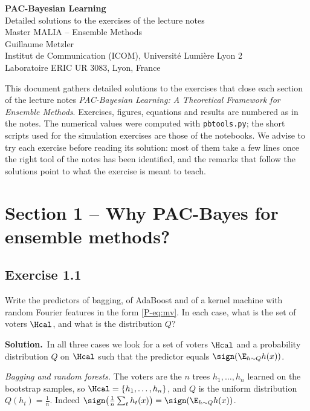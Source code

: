 \documentclass[11pt]{article}
\newcommand{\statement}[1]{\begin{tcolorbox}[enhanced,breakable,colback=black!3,colframe=black!25,boxrule=0.4pt,sharp corners,fontupper=\itshape\small]#1\end{tcolorbox}}
\newcommand{\exo}[1]{\Needspace{6\baselineskip}\subsection*{Exercise #1}\addcontentsline{toc}{subsection}{Exercise #1}}
\newcommand{\sol}{\noindent\textbf{Solution.}\ }
\begin{document}
\sloppy
\begin{center}
{\LARGE\bfseries PAC-Bayesian Learning}\\[0.2cm]
{\Large Detailed solutions to the exercises of the lecture notes}\\[0.3cm]
{\large Master MALIA -- Ensemble Methods}\\[0.4cm]
Guillaume Metzler\\
Institut de Communication (ICOM), Université Lumière Lyon 2\\
Laboratoire ERIC UR 3083, Lyon, France
\end{center}

\bigskip
\noindent This document gathers detailed solutions to the exercises that close each section of the lecture notes
\emph{PAC-Bayesian Learning: A Theoretical Framework for Ensemble Methods}. Exercises, figures, equations and results
are numbered as in the notes. The numerical values were computed with \texttt{pbtools.py}; the short scripts used
for the simulation exercises are those of the notebooks. We advise to try each exercise before reading its
solution: most of them take a few lines once the right tool of the notes has been identified, and the remarks
that follow the solutions point to what the exercise is meant to teach.

\tableofcontents
\bigskip

\section*{Section 1 -- Why PAC-Bayes for ensemble methods?}

\exo{1.1}
\statement{Write the predictors of bagging, of AdaBoost and of a kernel machine with random Fourier features in the
form \eqref{P-eq:mv}. In each case, what is the set of voters $\Hcal$, and what is the distribution $Q$?}

\sol In all three cases we look for a set of voters $\Hcal$ and a probability distribution $Q$ on $\Hcal$ such that the
predictor equals $\sign(\E_{h\sim Q}h(x))$.

\emph{Bagging and random forests.} The voters are the $n$ trees $h_1,\dots,h_n$ learned on the bootstrap samples, so
$\Hcal=\{h_1,\dots,h_n\}$, and $Q$ is the uniform distribution $Q(h_t)=\frac1n$. Indeed
$\sign\big(\frac1n\sum_th_t(x)\big)=\sign(\E_{h\sim Q}h(x))$.
\end{document}

